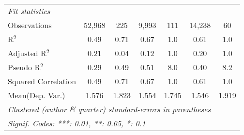 \begin{tabular}{lcccccc}
   \midrule
   \emph{Fit statistics}\\
   Observations                                               & 52,968         & 225     & 9,993          & 111          & 14,238       & 60\\  
   R$^2$                                                      & 0.49           & 0.71    & 0.67           & 1.0          & 0.61         & 1.0\\  
   Adjusted R$^2$                                             & 0.21           & 0.04    & 0.12           & 1.0          & 0.20         & 1.0\\  
   Pseudo R$^2$                                               & 0.29           & 0.49    & 0.51           & 8.0          & 0.40         & 8.2\\  
   Squared Correlation                                        & 0.49           & 0.71    & 0.67           & 1.0          & 0.61         & 1.0\\  
Mean(Dep. Var.) & 1.576 & 1.823 & 1.554 & 1.745 & 1.546 & 1.919 \\
   \midrule \midrule
   \multicolumn{7}{l}{\emph{Clustered (author \& quarter) standard-errors in parentheses}}\\
   \multicolumn{7}{l}{\emph{Signif. Codes: ***: 0.01, **: 0.05, *: 0.1}}\\
\end{tabular}
\par\endgroup
